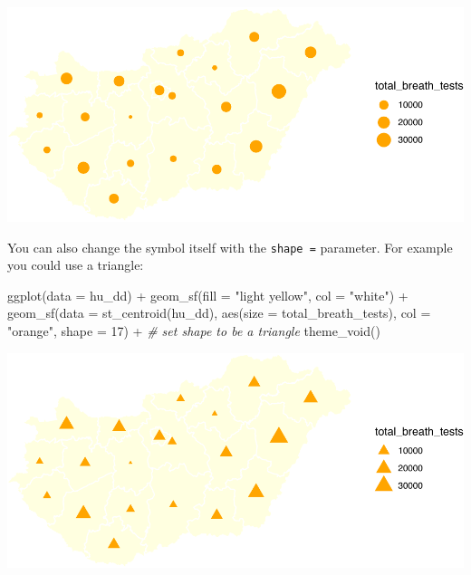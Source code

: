 \documentclass[
]{book}
\newenvironment{Shaded}{\begin{snugshade}}{\end{snugshade}}
\newcommand{\AttributeTok}[1]{\textcolor[rgb]{0.77,0.63,0.00}{#1}}
\newcommand{\CommentTok}[1]{\textcolor[rgb]{0.56,0.35,0.01}{\textit{#1}}}
\newcommand{\DecValTok}[1]{\textcolor[rgb]{0.00,0.00,0.81}{#1}}
\newcommand{\FunctionTok}[1]{\textcolor[rgb]{0.00,0.00,0.00}{#1}}
\newcommand{\NormalTok}[1]{#1}
\newcommand{\SpecialCharTok}[1]{\textcolor[rgb]{0.00,0.00,0.00}{#1}}
\newcommand{\StringTok}[1]{\textcolor[rgb]{0.31,0.60,0.02}{#1}}
\begin{document}
\includegraphics{crime_mapping_files/figure-latex/gradsymbmapcol-1.pdf}

You can also change the symbol itself with the \texttt{shape\ =} parameter. For example you could use a triangle:

\begin{Shaded}
\begin{Highlighting}[]
\FunctionTok{ggplot}\NormalTok{(}\AttributeTok{data =}\NormalTok{ hu\_dd) }\SpecialCharTok{+} 
  \FunctionTok{geom\_sf}\NormalTok{(}\AttributeTok{fill =} \StringTok{"light yellow"}\NormalTok{, }
          \AttributeTok{col =} \StringTok{"white"}\NormalTok{) }\SpecialCharTok{+} 
  \FunctionTok{geom\_sf}\NormalTok{(}\AttributeTok{data =} \FunctionTok{st\_centroid}\NormalTok{(hu\_dd), }
          \FunctionTok{aes}\NormalTok{(}\AttributeTok{size =}\NormalTok{ total\_breath\_tests), }
          \AttributeTok{col =} \StringTok{"orange"}\NormalTok{, }
          \AttributeTok{shape =} \DecValTok{17}\NormalTok{) }\SpecialCharTok{+} \CommentTok{\# set shape to be a triangle}
  \FunctionTok{theme\_void}\NormalTok{()}
\end{Highlighting}
\end{Shaded}

\includegraphics{crime_mapping_files/figure-latex/gradsymbmapcoltriangle-1.pdf}
\end{document}
